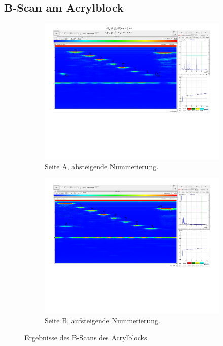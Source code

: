\subsection{B-Scan am Acrylblock}
\begin{figure}[h]
    \begin{subfigure}{0.48\textwidth}
        \centering
        \includegraphics[width=\textwidth]{Abbildungen/b scan acryl 1-Copy.pdf}
        \caption{Seite A, absteigende Nummerierung.}
    \end{subfigure}
    \hfill
    \begin{subfigure}{0.48\textwidth}
        \centering
        \includegraphics[width=\textwidth]{Abbildungen/b scan acryl 1 rueckseite-Copy.pdf}
        \caption{Seite B, aufsteigende Nummerierung.}
    \end{subfigure}
    \caption{Ergebnisse des B-Scans des Acrylblocks}
    \label{fig:b-scan}
\end{figure}


